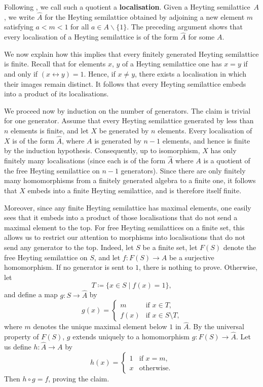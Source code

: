 \documentclass[reqno,a4paper]{amsart}
\theoremstyle{remark}
\theoremstyle{definition}
\newcommand{\defn}{\textbf}
\begin{document}
Following \cite{FreydHeyting}, we call such a quotient a \defn{localisation}. Given a Heyting semilattice~\(A\), we write \(\hat A\) for the Heyting semilattice obtained by adjoining a new element \(m\) satisfying \(a < m < 1\) for all \(a \in A\backslash\{1\}\). The preceding argument shows that every localisation of a Heyting semilattice is of the form \(\hat A\) for some \(A\).

We now explain how this implies that every finitely generated Heyting semilattice is finite. Recall that for elements \(x\), \(y\) of a Heyting semilattice one has \(x = y\) if and only if \((x \leftrightarrow y) = 1\). Hence, if \(x \neq y\), there exists a localisation in which their images remain distinct. It follows that every Heyting semilattice embeds into a product of its localisations.

We proceed now by induction on the number of generators. The claim is trivial for one generator. Assume that every Heyting semilattice generated by less than~\(n\) elements is finite, and let \(X\) be generated by \(n\) elements. Every localisation of \(X\) is of the form \(\hat A\), where \(A\) is generated by \(n-1\) elements, and hence is finite by the induction hypothesis. Consequently, up to isomorphism, \(X\) has only finitely many localisations (since each is of the form \(\hat A\) where \(A\) is a quotient of the free Heyting semilattice on \(n-1\) generators). Since there are only finitely many homomorphisms from a finitely generated algebra to a finite one, it follows that \(X\) embeds into a finite Heyting semilattice, and is therefore itself finite.

Moreover, since any finite Heyting semilattice has maximal elements, one easily sees that it embeds into a product of those localisations that do not send a maximal element to the top. For free Heyting semilattices on a finite set, this allows us to restrict our attention to morphisms into localisations that do not send any generator to the top. Indeed, let \(S\) be a finite set, let \(F(S)\) denote the free Heyting semilattice on \(S\), and let \(f \colon F(S) \to A\) be a surjective homomorphism. If no generator is sent to \(1\), there is nothing to prove. Otherwise, let
\[
	T \coloneq \{x \in S \mid f(x) = 1\},
\]
and define a map \(g \colon S \to \hat A\) by
\[
	g(x) =
	\begin{cases}
		m    & \text{if \(x \in T\),}             \\
		f(x) & \text{if \(x \in S \setminus T\),}
	\end{cases}
\]
where \(m\) denotes the unique maximal element below \(1\) in \(\hat A\). By the universal property of \(F(S)\), \(g\) extends uniquely to a homomorphism \(g \colon F(S) \to \hat A\). Let us define \(h \colon \hat A \to A\) by
\[
	h(x) =
	\begin{cases}
		1 & \text{if \(x = m\),} \\
		x & \text{otherwise}.
	\end{cases}
\]
Then \(h \circ g = f\), proving the claim.
\end{document}
